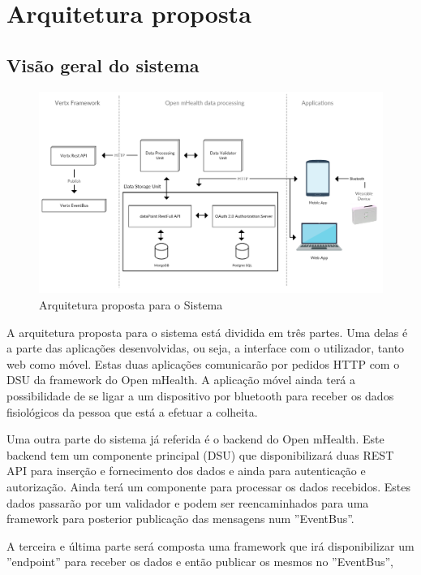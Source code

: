 \chapter{Arquitetura proposta}

\section{Visão geral do sistema}


\begin{figure}[H]
  \centering
  \includegraphics[width=1\textwidth]{imgs/arch-product.png}
  \caption[Arquitetura proposta para o Sistema]{Arquitetura proposta para o Sistema}
  
  \label{f:product-arch}
\end{figure}

A arquitetura proposta para o sistema está dividida em três partes. Uma delas é a parte das aplicações desenvolvidas, ou seja, a interface com o utilizador, tanto web como móvel. Estas duas aplicações comunicarão por pedidos \gls{HTTP} com o \gls{DSU} da framework do Open mHealth. A aplicação móvel ainda terá a possibilidade de se ligar a um dispositivo por bluetooth para receber os dados fisiológicos da pessoa que está a efetuar a colheita.
\par 
Uma outra parte do sistema já referida é o backend do Open mHealth. Este backend tem um componente principal (\gls{DSU}) que disponibilizará duas \gls{REST} \gls{API} para inserção e fornecimento dos dados e ainda para autenticação e autorização. Ainda terá um componente para processar os dados recebidos. Estes dados passarão por um validador e podem ser reencaminhados para uma framework para posterior publicação das mensagens num ''EventBus''.
\par
A terceira e última parte será composta uma framework que irá disponibilizar um ''endpoint'' para receber os dados e então publicar os mesmos no ''EventBus'',
